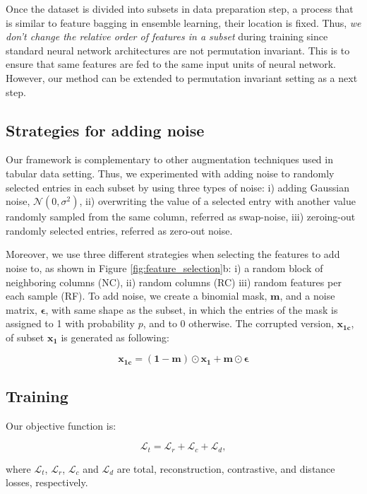 Once the dataset is divided into subsets in data preparation step, a process that is similar to feature bagging in ensemble learning, their location is fixed. Thus, \emph{we don't change the relative order of features in a subset} during training since standard neural network architectures are not permutation invariant. This is to ensure that same features are fed to the same input units of neural network. However, our method can be extended to permutation invariant setting as a next step.

\subsection{Strategies for adding noise} Our framework is complementary to other augmentation techniques used in tabular data setting. Thus, we experimented with adding noise to randomly selected entries in each subset by using three types of noise: i) adding Gaussian noise, $\mathcal{N}(0,\sigma^2)$, ii) overwriting  the value of a selected entry with another value randomly sampled from the same column, referred as swap-noise, iii) zeroing-out randomly selected entries, referred as zero-out noise. 

Moreover, we use three different strategies when selecting the features to add noise to, as shown in Figure \ref{fig:feature_selection}b: i) a random block of neighboring columns (NC), ii) random columns (RC) iii) random features per each sample (RF). To add noise,  we create a binomial mask, $\boldsymbol{m}$, and a noise matrix, $\boldsymbol{\epsilon}$, with same shape as the subset, in which the entries of the mask is assigned to 1 with probability $p$, and to 0 otherwise. The corrupted version, $\boldsymbol{x_{1c}}$, of subset $\boldsymbol{x_1}$ is generated as following:

\begin{equation} \label{eq0}
\boldsymbol{x_{1c} =(1-m)\odot x_1 + m\odot\epsilon}
\end{equation}

\subsection{Training}
Our objective function is:

\begin{equation} \label{eq1}
\mathcal{L}_t =\mathcal{L}_r+\mathcal{L}_c+\mathcal{L}_d,
\end{equation}

where $\mathcal{L}_t$, $\mathcal{L}_r$, $\mathcal{L}_c$ and $\mathcal{L}_d$ are total, reconstruction, contrastive, and distance losses, respectively.

